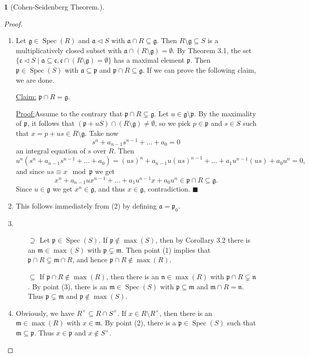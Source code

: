 \documentclass[12pt,a4paper]{report}
\theoremstyle{definition}
\theoremstyle{num.custom-title}
\newtheorem{teo_custom-title}[theorem]{} %
\newenvironment{claim}[1]{\par\noindent\underline{Claim#1:}\space}{} %
\newenvironment{claimproof}[1]{\par\noindent\underline{Proof:}\space#1}{\leavevmode\unskip\penalty9999 \hbox{}\nobreak\hfill\quad\hbox{$\blacksquare$}} %
\DeclareMathOperator{\sm}{\setminus}
\DeclareMathOperator{\sse}{\subseteq}
\DeclareMathOperator{\Spec}{Spec}
\newcommand{\g}{\mathfrak{g}}
\newcommand{\p}{\mathfrak{p}}
\newcommand{\m}{\mathfrak{m}}
\begin{document}
\begin{teo_custom-title}[Cohen-Seidenberg Theorem.]
\begin{proof}
\begin{enumerate}
Then there is a $p \in \p$ such that
\[
a_0 = p - x(x^{n-1} + \ldots + a_1) \in \mathfrak{a} \cap R = \p \cap R \sse \p,
\]
hence $x(x^{n-1} + \ldots + a_1) \in \p$. By minimality $x^{n-1} + \ldots + a_1 \not\in \p$, whereby $x \in \p$.
\item Let $\g \in \Spec(R)$ and $\mathfrak{a} \lhd S$ with $\mathfrak{a} \cap R \sse \g$. Then $R \sm \g \sse S$ is a multiplicatively closed subset with $\mathfrak{a} \cap (R \sm \g) = \emptyset$. By Theorem 3.1, the set $\{ \mathfrak{c} \lhd S \mid \mathfrak{a} \sse \mathfrak{c}, \mathfrak{c} \cap (R \sm \g) = \emptyset \}$ has a maximal element $\p$. Then $\p \in \Spec(S)$ with $\mathfrak{a} \sse \p$ and $\p \cap R \sse \g$. If we can prove the following claim, we are done.
\begin{claim}{}
$\p \cap R = \g$.
\begin{claimproof}
Assume to the contrary that $\p \cap R \subsetneq \g$. Let $u \in \g \sm \p$. By the maximality of $\p$, it follows that $(\p + uS) \cap (R \sm \g) \neq \emptyset$, so we pick $p \in \p$ and $s \in S$ such that $x = p+us \in R \sm \g$. Take now
\[
s^n+a_{n-1}s^{n-1} + \ldots + a_0 = 0
\]
an integral equation of $s$ over $R$. Then
\[
u^n (s^n+a_{n-1}s^{n-1} + \ldots + a_0) = (us)^n + a_{n-1} u (us)^{n-1} + \ldots + a_1 u^{n-1} (us) + a_0 u^n = 0,
\]
and since $us \equiv x \mod \p$ we get
\[
x^n + a_{n-1} u x^{n-1} + \ldots + a_1 u^{n-1} x + a_0 u^n \in \p \cap R \sse \g.
\]
Since $u \in \g$ we get $x^n \in \g$, and thus $x \in \g$, contradiction.
\end{claimproof}
\end{claim}
\item This follows immediately from (2) by defining $\mathfrak{a} = \p_0$.
\item 
\begin{itemize}
\item[$\supseteq$] Let $\p \in \Spec(S)$. If $\p \not\in \max(S)$, then by Corollary 3.2 there is an $\m \in \max(S)$ with $\p \subsetneq \m$. Then point (1) implies that $\p \cap R \subsetneq \m \cap R$, and hence $\p \cap R \not\in \max(R)$.
\item[$\sse$] If $\p \cap R \not\in \max(R)$, then there is an $\mathfrak{n} \in \max(R)$ with $\p \cap R \subsetneq \mathfrak{n}$. By point (3), there is an $\m \in \Spec(S)$ with $\p \sse \m$ and $\m \cap R = \mathfrak{n}$. Thus $\p \subsetneq \m$ and $\p \not\in \max(S)$.
\end{itemize}
\item Obviously, we have $R^\times \sse R \cap S^\times$. If $x \in R \sm R^\times$, then there is an $\m \in \max(R)$ with $x \in \m$. By point (2), there is a $\p \in \Spec(S)$ such that $\m \sse \p$. Thus $x \in \p$ and $x \not\in S^\times$.\\

\end{enumerate}
\end{proof}
\end{teo_custom-title}
\end{document}
